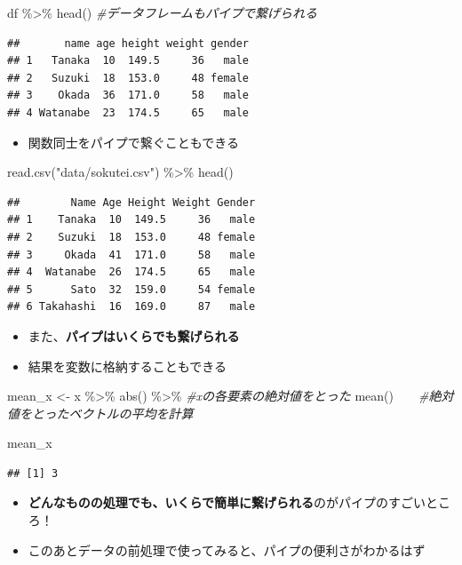 \documentclass[
]{book}
\newenvironment{Shaded}{\begin{snugshade}}{\end{snugshade}}
\newcommand{\CommentTok}[1]{\textcolor[rgb]{0.56,0.35,0.01}{\textit{#1}}}
\newcommand{\FunctionTok}[1]{\textcolor[rgb]{0.00,0.00,0.00}{#1}}
\newcommand{\NormalTok}[1]{#1}
\newcommand{\OtherTok}[1]{\textcolor[rgb]{0.56,0.35,0.01}{#1}}
\newcommand{\SpecialCharTok}[1]{\textcolor[rgb]{0.00,0.00,0.00}{#1}}
\newcommand{\StringTok}[1]{\textcolor[rgb]{0.31,0.60,0.02}{#1}}
\providecommand{\tightlist}{%
  \setlength{\itemsep}{0pt}\setlength{\parskip}{0pt}}
\begin{document}
\begin{Shaded}
\begin{Highlighting}[]
\NormalTok{df }\SpecialCharTok{\%\textgreater{}\%} \FunctionTok{head}\NormalTok{() }\CommentTok{\#データフレームもパイプで繋げられる}
\end{Highlighting}
\end{Shaded}

\begin{verbatim}
##       name age height weight gender
## 1   Tanaka  10  149.5     36   male
## 2   Suzuki  18  153.0     48 female
## 3    Okada  36  171.0     58   male
## 4 Watanabe  23  174.5     65   male
\end{verbatim}

\begin{itemize}
\tightlist
\item
  関数同士をパイプで繋ぐこともできる
\end{itemize}

\begin{Shaded}
\begin{Highlighting}[]
\FunctionTok{read.csv}\NormalTok{(}\StringTok{"data/sokutei.csv"}\NormalTok{) }\SpecialCharTok{\%\textgreater{}\%} \FunctionTok{head}\NormalTok{() }
\end{Highlighting}
\end{Shaded}

\begin{verbatim}
##        Name Age Height Weight Gender
## 1    Tanaka  10  149.5     36   male
## 2    Suzuki  18  153.0     48 female
## 3     Okada  41  171.0     58   male
## 4  Watanabe  26  174.5     65   male
## 5      Sato  32  159.0     54 female
## 6 Takahashi  16  169.0     87   male
\end{verbatim}

\begin{itemize}
\tightlist
\item
  また、\textbf{パイプはいくらでも繋げられる}
\item
  結果を変数に格納することもできる
\end{itemize}

\begin{Shaded}
\begin{Highlighting}[]
\NormalTok{mean\_x }\OtherTok{\textless{}{-}} 
\NormalTok{  x }\SpecialCharTok{\%\textgreater{}\%} 
  \FunctionTok{abs}\NormalTok{() }\SpecialCharTok{\%\textgreater{}\%} \CommentTok{\#xの各要素の絶対値をとった}
  \FunctionTok{mean}\NormalTok{()　　}\CommentTok{\#絶対値をとったベクトルの平均を計算}

\NormalTok{mean\_x}
\end{Highlighting}
\end{Shaded}

\begin{verbatim}
## [1] 3
\end{verbatim}

\begin{itemize}
\tightlist
\item
  \textbf{どんなものの処理でも、いくらで簡単に繋げられる}のがパイプのすごいところ！
\item
  このあとデータの前処理で使ってみると、パイプの便利さがわかるはず
\end{itemize}

  
\end{document}
